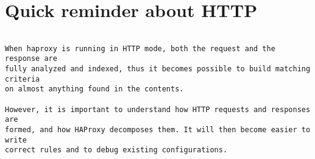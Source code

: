 
\chapter{Quick reminder about HTTP}

\begin{verbatim}

When haproxy is running in HTTP mode, both the request and the response are
fully analyzed and indexed, thus it becomes possible to build matching criteria
on almost anything found in the contents.

However, it is important to understand how HTTP requests and responses are
formed, and how HAProxy decomposes them. It will then become easier to write
correct rules and to debug existing configurations.


\end{verbatim}
